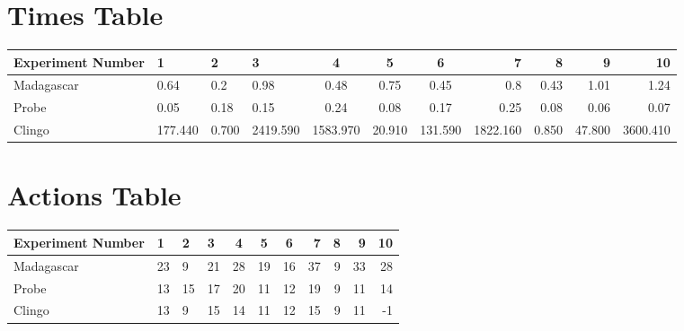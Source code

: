 \documentclass[8pt]{article}
\begin{document}
\begin{landscape}
\section{Times Table}\begin{tabular}{ | l | l | l | l | c | c | c | r | r | r | r | }\hline
Experiment Number & 1 & 2 & 3 & 4 & 5 & 6 & 7 & 8 & 9 & 10\\  \hline
Madagascar & 0.64 & 0.2 & 0.98 & 0.48 & 0.75 & 0.45 & 0.8 & 0.43 & 1.01 & 1.24\\  \hline
Probe & 0.05 & 0.18 & 0.15 & 0.24 & 0.08 & 0.17 & 0.25 & 0.08 & 0.06 & 0.07\\  \hline
Clingo & 177.440 & 0.700 & 2419.590 & 1583.970 & 20.910 & 131.590 & 1822.160 & 0.850 & 47.800 & 3600.410\\  \hline
\end{tabular}
\section{Actions Table}\begin{tabular}{ | l | l | l | l | c | c | c | r | r | r | r | }\hline
Experiment Number & 1 & 2 & 3 & 4 & 5 & 6 & 7 & 8 & 9 & 10\\ \hline
 Madagascar & 23 & 9 & 21 & 28 & 19 & 16 & 37 & 9 & 33 & 28\\ \hline
 Probe & 13 & 15 & 17 & 20 & 11 & 12 & 19 & 9 & 11 & 14\\ \hline
 Clingo & 13 & 9 & 15 & 14 & 11 & 12 & 15 & 9 & 11 & -1\\ \hline
\end{tabular}
\end{landscape}
\end{document}
